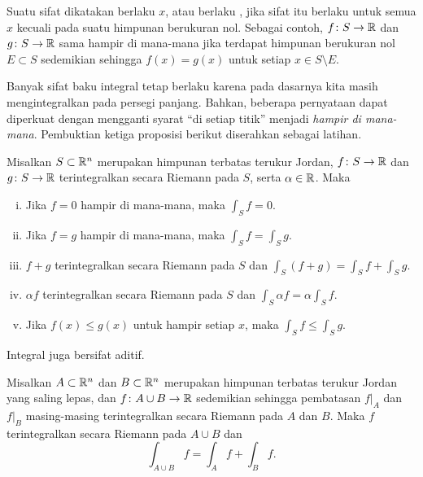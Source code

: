 Suatu sifat dikatakan berlaku
\emph{ $x$}, atau berlaku
\emph{}, jika sifat itu berlaku untuk semua $x$
kecuali pada suatu himpunan berukuran nol. Sebagai contoh,
$f \colon S \to {\mathbb{R}}$ dan $g \colon S \to {\mathbb{R}}$ sama hampir di mana-mana jika
terdapat himpunan berukuran nol $E \subset S$ sedemikian sehingga
$f(x) = g(x)$ untuk setiap $x \in S \setminus E$.

\medskip

Banyak sifat baku integral tetap berlaku karena pada dasarnya kita masih
mengintegralkan pada persegi panjang. Bahkan, beberapa pernyataan dapat
diperkuat dengan mengganti syarat ``di setiap titik'' menjadi
\emph{hampir di mana-mana}. Pembuktian ketiga proposisi berikut diserahkan
sebagai latihan.

\begin{prop} \label{prop:jordanintbasic}
Misalkan $S \subset {\mathbb{R}}^n$ merupakan himpunan terbatas terukur Jordan,
$f \colon S \to {\mathbb{R}}$ dan $g \colon S \to {\mathbb{R}}$ terintegralkan secara Riemann
pada $S$, serta $\alpha \in {\mathbb{R}}$. Maka
\begin{enumerate}[(i)]
\item
Jika $f = 0$ hampir di mana-mana, maka $\int_S f = 0$.
\item
Jika $f = g$ hampir di mana-mana, maka $\int_S f = \int_S g$.
\item
$f+g$ terintegralkan secara Riemann pada $S$ dan
$\int_S (f+g) = \int_S f + \int_S g$.
\item
$\alpha f$ terintegralkan secara Riemann pada $S$ dan
$\int_S \alpha f = \alpha \int_S f$.
\item
Jika $f(x) \leq g(x)$ untuk hampir setiap $x$, maka
$\int_S f \leq \int_S g$.
\end{enumerate}
\end{prop}

Integral juga bersifat aditif.

\begin{prop} \label{prop:jordanintadd}
Misalkan $A \subset {\mathbb{R}}^n$ dan $B \subset {\mathbb{R}}^n$ merupakan himpunan terbatas
terukur Jordan yang saling lepas, dan $f \colon A \cup B \to {\mathbb{R}}$ sedemikian
sehingga pembatasan $f|_A$ dan $f|_B$ masing-masing terintegralkan secara
Riemann pada $A$ dan $B$. Maka $f$ terintegralkan secara Riemann pada
$A \cup B$ dan
\begin{equation*}
\int_{A \cup B} f = \int_A f + \int_B f .
\end{equation*}
\end{prop}

